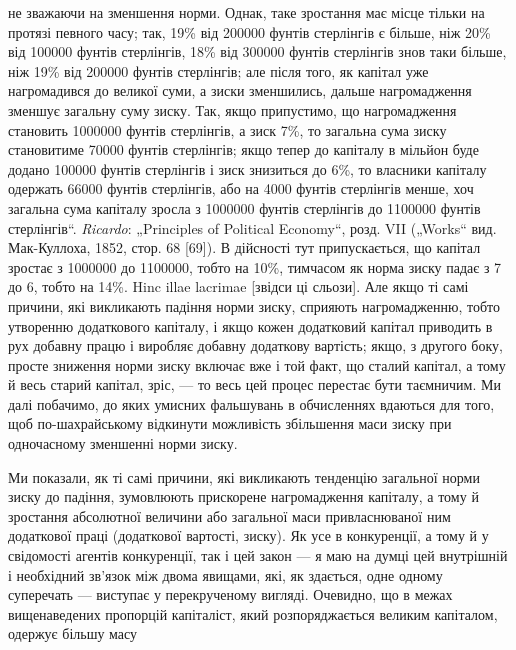 {не зважаючи на зменшення норми. Однак, таке зростання має місце тільки на
протязі певного часу; так, 19\% від 200000 фунтів стерлінгів є більше, ніж 20\%
від 100000 фунтів стерлінгів, 18\% від 300000 фунтів стерлінгів знов таки
більше, ніж 19\% від 200000 фунтів стерлінгів; але після того, як капітал уже
нагромадився до великої суми, а зиски зменшились, дальше нагромадження
зменшує загальну суму зиску. Так, якщо припустимо, що нагромадження
становить 1000000 фунтів стерлінгів, а зиск 7\%, то загальна сума зиску становитиме
70000 фунтів стерлінгів; якщо тепер до капіталу в мільйон буде
додано 100000 фунтів стерлінгів і зиск знизиться до 6\%, то власники капіталу
одержать 66000 фунтів стерлінгів, або на 4000 фунтів стерлінгів менше, хоч
загальна сума капіталу зросла з 1000000 фунтів стерлінгів до 1100000 фунтів
стерлінгів“. \emph{Ricardo}: „Principles of Political Economy“, розд. VII („Works“
вид. Мак-Куллоха, 1852, стор. 68 [69]). В дійсності тут припускається, що капітал
зростає з 1000000 до 1100000, тобто на 10\%, тимчасом як норма зиску
падає з 7 до 6, тобто на 14\%. Hinc illae lacrimae [звідси ці сльози].} Але
якщо ті самі причини, які викликають падіння норми зиску,
сприяють нагромадженню, тобто утворенню додаткового капіталу,
і якщо кожен додатковий капітал приводить в рух добавну
працю і виробляє добавну додаткову вартість; якщо, з другого
боку, просте зниження норми зиску включає вже і той
факт, що сталий капітал, а тому й весь старий капітал, зріс, —
то весь цей процес перестає бути таємничим. Ми далі побачимо,
до яких умисних фальшувань в обчисленнях вдаються
для того, щоб по-шахрайському відкинути можливість збільшення
маси зиску при одночасному зменшенні норми зиску.

Ми показали, як ті самі причини, які викликають тенденцію
загальної норми зиску до падіння, зумовлюють прискорене нагромадження
капіталу, а тому й зростання абсолютної величини або
загальної маси привласнюваної ним додаткової праці (додаткової
вартості, зиску). Як усе в конкуренції, а тому й у свідомості
агентів конкуренції, так і цей закон — я маю на думці цей внутрішній
і необхідний зв’язок між двома явищами, які, як здається,
одне одному суперечать — виступає у перекрученому вигляді.
Очевидно, що в межах вищенаведених пропорцій капіталіст,
який розпоряджається великим капіталом, одержує більшу масу
\parbreak{}  %
